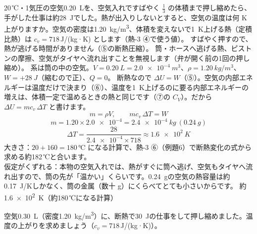 \label{ph:熱-2:ex9}
\begin{phreidai}
20\,℃・1気圧の空気\qty{0.20}{L}を、空気入れですばやく $\tfrac{1}{3}$ の体積まで押し縮めたら、手がした仕事は約\qty{28}{J}でした。熱が出入りしないとすると、空気の温度は何 K 上がりますか。空気の密度は\qty{1.20}{kg/m^3}、体積を変えないで\qty{1}{K}上げる熱（定積比熱）は $c_v=718$\,J/(kg·K) とします（熱-3 ④で使う値）。
\phbamen
すばやく押すので、熱が逃げる時間がありません（⑤の断熱圧縮）。
\phmushi
筒・ホースへ逃げる熱、ピストンの摩擦、空気がタイヤへ流れ出すことを無視します（弁が開く前の1回の押し縮め）。
\phzu
系は筒の中の空気。$V=\qty{0.20}{L}=\qty{2.0e-4}{m^3}$、$\rho=\qty{1.20}{kg/m^3}$、$W=+\qty{28}{J}$（縮むので正）、$Q=0$。
\phriyu
断熱なので $\Delta U=W$（⑤）。空気の内部エネルギーは温度だけで決まり（⑥）、温度を\qty{1}{K}上げるのに要る内部エネルギーの増えは、体積一定で温めるときの熱と同じです（⑦の $C_V$）。だから $\Delta U=mc_v\,\Delta T$ と書けます。
\phtateru
\[m=\rho V,\qquad mc_v\,\Delta T=W\]
\phtoku
\[m=1.20\times\num{2.0e-4}=\qty{2.4e-4}{kg}\ (\qty{0.24}{g})\]
\[\Delta T=\frac{28}{\num{2.4e-4}\times718}\approx\qty{1.6e2}{K}\]
\phtashikame
大きさ：$20+160=180\,℃$ になる計算で、熱-3 ⑥（例題6）で断熱変化の式から求める約182\,℃と合います。\\
仮定がくずれる：本物の空気入れでは、熱がすぐに筒へ逃げ、空気もタイヤへ流れ出すので、筒の先が「温かい」くらいです。\qty{0.24}{g}の空気の熱容量は約\qty{0.17}{J/K}しかなく、筒の金属（数十 g）にくらべてとても小さいからです。
\kotae 約\qty{1.6e2}{K}（約180\,℃になる計算）
\end{phreidai}
\begin{jibun}
空気\qty{0.30}{L}（密度\qty{1.20}{kg/m^3}）に、断熱で\qty{30}{J}の仕事をして押し縮めました。温度の上がりを求めましょう（$c_v=718$\,J/(kg·K)）。
\end{jibun}

